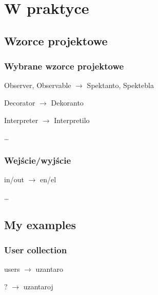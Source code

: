 \documentclass{beamer}
\begin{document}
%  	
%
 
  \section{W praktyce}
  \subsection{Wzorce projektowe}
  
\begin{frame}
	\frametitle{Wybrane wzorce projektowe}
	
	\begin{block}{}
		Observer, Observable $\rightarrow$ Spektanto, Spektebla
	\end{block}
	
	\begin{block}{}
		Decorator $\rightarrow$ Dekoranto
	\end{block}
	
	\begin{block}{}
		Interpreter $\rightarrow$ Interpretilo
	\end{block}
	
	\dots
\end{frame}  

\begin{frame}
	\frametitle{Wejście/wyjście}
	
	\begin{block}{}
		in/out $\rightarrow$ en/el
	\end{block}
	
	\dots
\end{frame}  
    
  \subsection{My examples}
  
  \begin{frame}
  	\frametitle{User collection}

	\begin{block}{}
		users $\rightarrow$ uzantaro
	\end{block}
	\begin{block}{}
		? $\rightarrow$ uzantaroj
	\end{block}
	
  \end{frame}
  
\end{document}
